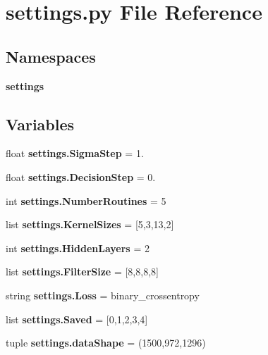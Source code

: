 \section{settings.\+py File Reference}
\label{settings_8py}
\subsection*{Namespaces}
\begin{DoxyCompactItemize}
\item 
 \textbf{ settings}
\end{DoxyCompactItemize}
\subsection*{Variables}
\begin{DoxyCompactItemize}
\item 
float \textbf{ settings.\+Sigma\+Step} = 1.
\item 
float \textbf{ settings.\+Decision\+Step} = 0.
\item 
int \textbf{ settings.\+Number\+Routines} = 5
\item 
list \textbf{ settings.\+Kernel\+Sizes} = [5,3,13,2]
\item 
int \textbf{ settings.\+Hidden\+Layers} = 2
\item 
list \textbf{ settings.\+Filter\+Size} = [8,8,8,8]
\item 
string \textbf{ settings.\+Loss} = \textquotesingle{}binary\+\_\+crossentropy\textquotesingle{}
\item 
list \textbf{ settings.\+Saved} = [0,1,2,3,4]
\item 
tuple \textbf{ settings.\+data\+Shape} = (1500,972,1296)
\end{DoxyCompactItemize}
